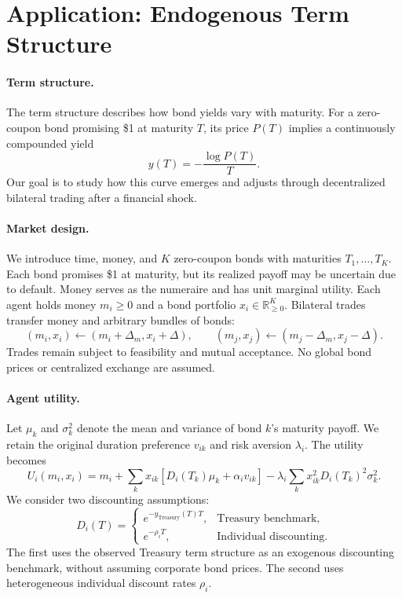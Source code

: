 
\section{Application: Endogenous Term Structure}

\paragraph{Term structure.}
The term structure describes how bond yields vary with maturity. For a zero-coupon bond promising \$1 at maturity $T$, its price $P(T)$ implies a continuously compounded yield
\[
y(T)=-\frac{\log P(T)}{T}.
\]
Our goal is to study how this curve emerges and adjusts through decentralized bilateral trading after a financial shock.

\paragraph{Market design.}
We introduce time, money, and $K$ zero-coupon bonds with maturities $T_1,\ldots,T_K$. Each bond promises \$1 at maturity, but its realized payoff may be uncertain due to default. Money serves as the numeraire and has unit marginal utility. Each agent holds money $m_i\geq 0$ and a bond portfolio $x_i\in\mathbb{R}_{\geq 0}^K$. Bilateral trades transfer money and arbitrary bundles of bonds:
\[
(m_i,x_i)\leftarrow(m_i+\Delta_m,x_i+\Delta),
\qquad
(m_j,x_j)\leftarrow(m_j-\Delta_m,x_j-\Delta).
\]
Trades remain subject to feasibility and mutual acceptance. No global bond prices or centralized exchange are assumed.

\paragraph{Agent utility.}
Let $\mu_k$ and $\sigma_k^2$ denote the mean and variance of bond $k$'s maturity payoff. We retain the original duration preference $v_{ik}$ and risk aversion $\lambda_i$. The utility becomes
\[
U_i(m_i,x_i)
=m_i+\sum_k x_{ik}\left[D_i(T_k)\mu_k+\alpha_i v_{ik}\right]
-\lambda_i\sum_k x_{ik}^2D_i(T_k)^2\sigma_k^2.
\]
We consider two discounting assumptions:
\[
D_i(T)=
\begin{cases}
e^{-y_{\mathrm{Treasury}}(T)T}, & \text{Treasury benchmark},\\
e^{-\rho_i T}, & \text{Individual discounting}.
\end{cases}
\]
The first uses the observed Treasury term structure as an exogenous discounting benchmark, without assuming corporate bond prices. The second uses heterogeneous individual discount rates $\rho_i$.

